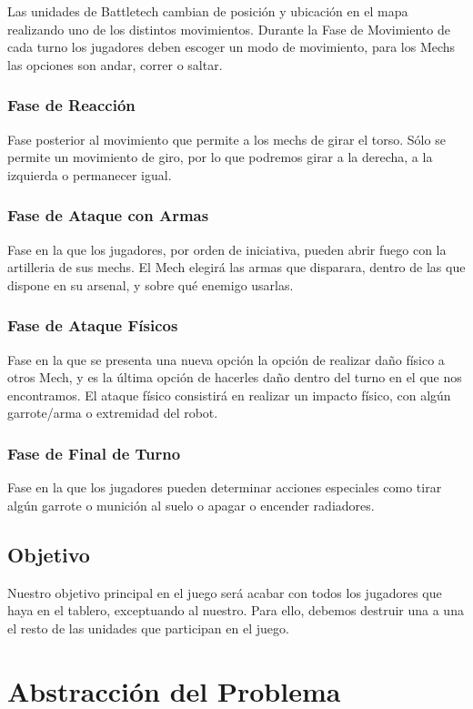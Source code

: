 \documentclass[a4paper,12pt,oneside]{book}
\begin{document}
Las unidades de Battletech cambian de posición y ubicación
en el mapa realizando uno de los distintos movimientos. Durante la
Fase de Movimiento de cada turno los jugadores deben escoger un modo
de movimiento, para los Mechs las opciones son andar, correr o saltar.

\subsubsection{ Fase de Reacción }
Fase posterior al movimiento que permite a los mechs de girar el
torso. Sólo se permite un movimiento de giro, por lo que podremos
girar a la derecha, a la izquierda o permanecer igual.

\subsubsection{ Fase de Ataque con Armas } 
Fase en la que los jugadores, por orden de iniciativa, pueden abrir
fuego con la artilleria de sus mechs. El Mech elegirá las armas que
disparara, dentro de las que dispone en su arsenal, y sobre qué
enemigo usarlas.

\subsubsection{ Fase de Ataque Físicos }
Fase en la que se presenta una nueva opción la opción de realizar daño
físico a otros Mech, y es la última opción de hacerles daño dentro del
turno en el que nos encontramos.
El ataque físico consistirá en realizar un impacto físico, con algún
garrote/arma o extremidad del robot.

\subsubsection{Fase  de Final de Turno }
Fase en la que los jugadores pueden determinar acciones especiales como
tirar algún garrote o munición al suelo o apagar o encender radiadores.

\subsection {Objetivo}
Nuestro objetivo principal en el juego será acabar con todos los
jugadores que haya en el tablero, exceptuando al nuestro. Para ello,
debemos destruir una a una el resto de las unidades que participan en
el juego.


\section {Abstracción del Problema}
\end{document}
